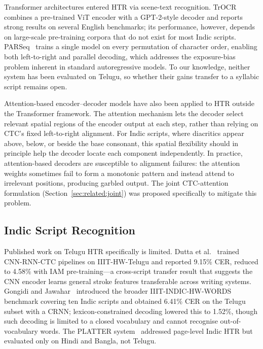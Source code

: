 \documentclass[pdflatex,sn-mathphys-num]{sn-jnl}
\begin{document}
Transformer architectures entered HTR via scene-text recognition. TrOCR~\cite{li2023trocr} combines a pre-trained ViT encoder with a GPT-2-style decoder and reports strong results on several English benchmarks; its performance, however, depends on large-scale pre-training corpora that do not exist for most Indic scripts. PARSeq~\cite{bautista2022parseq} trains a single model on every permutation of character order, enabling both left-to-right and parallel decoding, which addresses the exposure-bias problem inherent in standard autoregressive models. To our knowledge, neither system has been evaluated on Telugu, so whether their gains transfer to a syllabic script remains open.

Attention-based encoder--decoder models have also been applied to HTR outside the Transformer framework. The attention mechanism lets the decoder select relevant spatial regions of the encoder output at each step, rather than relying on CTC's fixed left-to-right alignment. For Indic scripts, where diacritics appear above, below, or beside the base consonant, this spatial flexibility should in principle help the decoder locate each component independently. In practice, attention-based decoders are susceptible to alignment failures: the attention weights sometimes fail to form a monotonic pattern and instead attend to irrelevant positions, producing garbled output. The joint CTC-attention formulation (Section~\ref{sec:related:joint}) was proposed specifically to mitigate this problem.

\subsection{Indic Script Recognition}\label{sec:related:indic}

Published work on Telugu HTR specifically is limited. Dutta et al.~\cite{dutta2018} trained CNN-RNN-CTC pipelines on IIIT-HW-Telugu and reported 9.15\% CER, reduced to 4.58\% with IAM pre-training---a cross-script transfer result that suggests the CNN encoder learns general stroke features transferable across writing systems. Gongidi and Jawahar~\cite{gongidi2021iiit} introduced the broader IIIT-INDIC-HW-WORDS benchmark covering ten Indic scripts and obtained 6.41\% CER on the Telugu subset with a CRNN; lexicon-constrained decoding lowered this to 1.52\%, though such decoding is limited to a closed vocabulary and cannot recognise out-of-vocabulary words. The PLATTER system~\cite{platter2025} addressed page-level Indic HTR but evaluated only on Hindi and Bangla, not Telugu.
\end{document}
